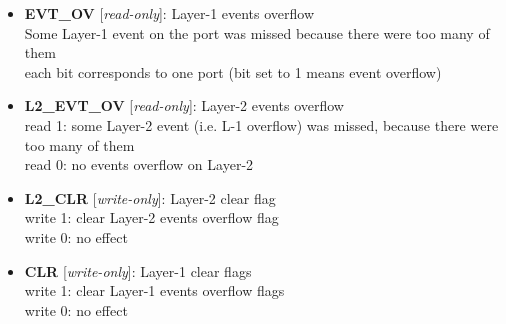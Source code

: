 \vspace{12pt}
\noindent
{}

\begin{itemize}
\item \begin{small}
{\bf 
EVT\_OV
} [\emph{read-only}]: Layer-1 events overflow
\\
Some Layer-1 event on the port was missed because there were too many of them \\                     each bit corresponds to one port (bit set to 1 means event overflow)
\end{small}
\item \begin{small}
{\bf 
L2\_EVT\_OV
} [\emph{read-only}]: Layer-2 events overflow
\\
read 1: some Layer-2 event (i.e. L-1 overflow) was missed, because there were too many of them \\                     read 0: no events overflow on Layer-2
\end{small}
\item \begin{small}
{\bf 
L2\_CLR
} [\emph{write-only}]: Layer-2 clear flag
\\
write 1: clear Layer-2 events overflow flag \\                     write 0: no effect
\end{small}
\item \begin{small}
{\bf 
CLR
} [\emph{write-only}]: Layer-1 clear flags
\\
write 1: clear Layer-1 events overflow flags \\                     write 0: no effect
\end{small}
\end{itemize}
